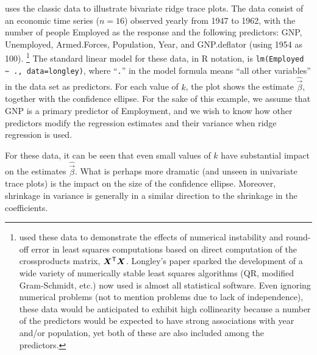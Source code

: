  uses the classic \citet{Longley:1967}
data to illustrate
bivariate ridge trace plots.  The data consist of an economic time series ($n=16$)
observed yearly from 1947 to 1962, with the number of people Employed as the
response and the following predictors:
GNP, Unemployed,  Armed.Forces,  Population,  Year, and GNP.deflator (using
1954 as 100).%
\footnote{
\citet{Longley:1967} used these data to demonstrate the effects of
numerical instability and round-off error in least squares computations
based on direct computation of the crossproducts matrix, $\bm{X}^\mathsf{T}\bm{X}$.
Longley's paper sparked the development of a wide variety of
numerically stable least squares algorithms (QR, modified Gram-Schmidt, etc.)
now used is almost all statistical software.
Even ignoring numerical problems
(not to mention problems due to lack of independence), these
data would be anticipated to exhibit high collinearity because
a number of the predictors would be expected to have strong associations
with year and/or population, yet both of these are also included among the
predictors.
}
The standard linear model for these data, in R notation,
is \verb|lm(Employed ~ ., data=longley)|, where ``\texttt{.}''  in the model formula means
``all other variables'' in the data set as predictors.  
For each value of $k$, the plot
shows the estimate $\widehat{\vec{\beta}}$, together with the confidence
ellipse.  For the sake of this example, we assume that GNP is a primary
predictor of Employment, and we wish to know how other predictors modify the
regression estimates and their variance when ridge regression is used.

For these data, it can be seen that even small values of $k$ have substantial
impact on the estimates $\widehat{\vec{\beta}}$. What is perhaps more dramatic
(and unseen in univariate trace plots) is the impact on the size of the confidence
ellipse.  Moreover, shrinkage in variance is generally in a similar direction to the
shrinkage in the coefficients.
